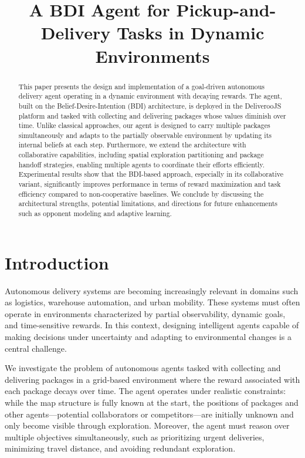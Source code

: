 \documentclass[conference]{IEEEtran}
\title{A BDI Agent for Pickup-and-Delivery Tasks in Dynamic Environments}
\author{
	\IEEEauthorblockN{Mauro Antonio de Palma - 256175}
	\IEEEauthorblockA{Email: mauroantonio.depalma@studenti.unitn.it}
	\and
	\IEEEauthorblockN{Marco Crespi - 241177}
	\IEEEauthorblockA{Email: marco.crespi@studenti.unitn.it}
}
\begin{document}
\maketitle

\begin{abstract}
	This paper presents the design and implementation of a goal-driven autonomous delivery agent operating in a dynamic environment with decaying rewards. The agent, built on the Belief-Desire-Intention (BDI) architecture, is deployed in the DeliverooJS platform and tasked with collecting and delivering packages whose values diminish over time. Unlike classical approaches, our agent is designed to carry multiple packages simultaneously and adapts to the partially observable environment by updating its internal beliefs at each step. Furthermore, we extend the architecture with collaborative capabilities, including spatial exploration partitioning and package handoff strategies, enabling multiple agents to coordinate their efforts efficiently. Experimental results show that the BDI-based approach, especially in its collaborative variant, significantly improves performance in terms of reward maximization and task efficiency compared to non-cooperative baselines. We conclude by discussing the architectural strengths, potential limitations, and directions for future enhancements such as opponent modeling and adaptive learning.
\end{abstract}

\section{Introduction}

Autonomous delivery systems are becoming increasingly relevant in domains such as logistics, warehouse automation, and urban mobility. These systems must often operate in environments characterized by partial observability, dynamic goals, and time-sensitive rewards. In this context, designing intelligent agents capable of making decisions under uncertainty and adapting to environmental changes is a central challenge.

We investigate the problem of autonomous agents tasked with collecting and delivering packages in a grid-based environment where the reward associated with each package decays over time. The agent operates under realistic constraints: while the map structure is fully known at the start, the positions of packages and other agents—potential collaborators or competitors—are initially unknown and only become visible through exploration. Moreover, the agent must reason over multiple objectives simultaneously, such as prioritizing urgent deliveries, minimizing travel distance, and avoiding redundant exploration.
\end{document}
